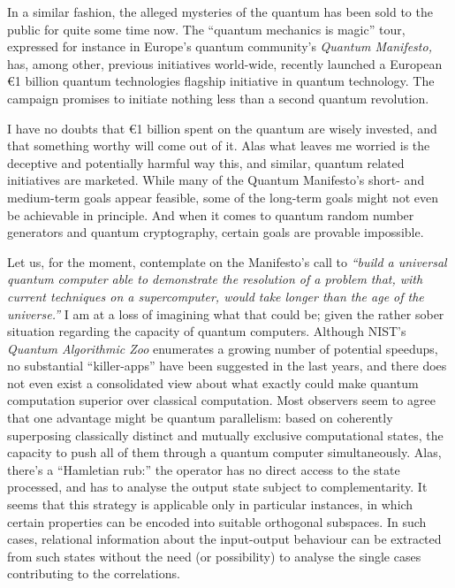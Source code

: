 \documentclass[%
 preprint,
 showpacs,
 showkeys,
 preprintnumbers,
 amsmath,amssymb,
 aps,
  pra,
  longbibliography,
 ]{revtex4-1}
\begin{document}
In a similar fashion, the alleged mysteries of the quantum has been sold to the public for quite some time now.
The ``quantum mechanics is magic'' tour, expressed for instance in
Europe's quantum community's {\it Quantum Manifesto,} has, among other, previous initiatives world-wide,
recently launched a European \euro{}1 billion quantum technologies flagship initiative in quantum technology.
The campaign promises to initiate nothing less than a second quantum revolution.

I have no doubts that \euro{}1 billion spent on the quantum are wisely invested, and that something worthy will come out of it.
Alas what leaves me worried is the deceptive and potentially harmful way this, and similar, quantum related initiatives are marketed.
While many of the  Quantum Manifesto's short- and medium-term goals appear feasible,
some of the long-term goals might not even be achievable in principle.
And when it comes to quantum random number generators and quantum cryptography, certain goals are provable impossible.

Let us, for the moment, contemplate on the Manifesto's call to
{\em ``build a universal quantum computer able to demonstrate the resolution of a problem that, with
current techniques on a supercomputer, would take longer than the age of the universe.''}
I am at a loss of imagining what that could be; given the rather sober situation regarding the capacity of quantum computers.
Although NIST's {\em Quantum Algorithmic Zoo} enumerates a growing number of potential speedups,
no substantial ``killer-apps'' have been suggested in the last years,
and
there does not even exist a consolidated view about what exactly could make quantum computation superior over classical computation.
Most observers seem to agree that one advantage might be quantum parallelism:
based on coherently superposing
classically distinct and mutually exclusive computational states, the capacity to push all of them
through a quantum computer simultaneously.
Alas, there's a ``Hamletian rub:'' the operator has no direct access to the state processed,
and has to analyse the output state subject to complementarity.
It seems that this strategy is applicable only in particular instances,
in which certain properties can be encoded into suitable orthogonal subspaces.
In such cases, relational information about the input-output behaviour can be extracted from such states
without the need (or possibility) to analyse the single cases contributing to the correlations.
\end{document}
